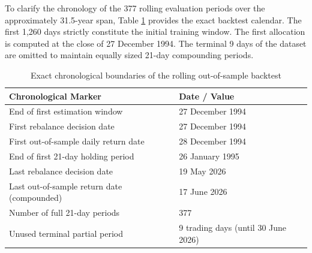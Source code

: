 \documentclass[smallextended]{svjour3}
\begin{document}
To clarify the chronology of the 377 rolling evaluation periods over the approximately 31.5-year span, Table \ref{tab:timeline} provides the exact backtest calendar. The first 1,260 days strictly constitute the initial training window. The first allocation is computed at the close of 27 December 1994. The terminal 9 days of the dataset are omitted to maintain equally sized 21-day compounding periods.

\begin{table}[htbp]
\centering
\caption{Exact chronological boundaries of the rolling out-of-sample backtest}
\label{tab:timeline}
\begin{tabular}{ll}
\toprule
\textbf{Chronological Marker} & \textbf{Date / Value} \\
\midrule
End of first estimation window & 27 December 1994 \\
First rebalance decision date & 27 December 1994 \\
First out-of-sample daily return date & 28 December 1994 \\
End of first 21-day holding period & 26 January 1995 \\
Last rebalance decision date & 19 May 2026 \\
Last out-of-sample return date (compounded) & 17 June 2026 \\
Number of full 21-day periods & 377 \\
Unused terminal partial period & 9 trading days (until 30 June 2026) \\
\bottomrule
\end{tabular}
\end{table}
\end{document}
